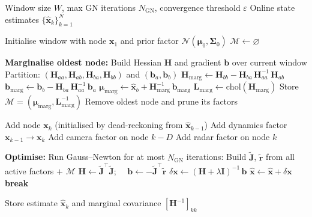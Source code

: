 \documentclass[11pt,a4paper]{article}
\newcommand{\bx}{\bm{x}}
\newcommand{\br}{\bm{r}}
\newcommand{\bb}{\bm{b}}
\newcommand{\bJ}{\bm{J}}
\newcommand{\bH}{\bm{H}}
\newcommand{\bI}{\bm{I}}
\newcommand{\bSigma}{\bm{\Sigma}}
\theoremstyle{definition}
\theoremstyle{plain}
\begin{document}
\begin{algorithm}[H]
\caption{Online Sliding-Window Factor Graph Optimisation}
\label{alg:swfgo}
\begin{algorithmic}[1]
\Require Window size $W$, max GN iterations $N_{\text{GN}}$, convergence threshold $\varepsilon$
\Ensure  Online state estimates $\{\hat{\bx}_k\}_{k=1}^{N}$

\State Initialise window with node $\bx_1$ and prior factor $\mathcal{N}(\bm{\mu}_0, \bSigma_0)$
\State $\mathcal{M} \leftarrow \varnothing$ 

    \State \textbf{Marginalise oldest node:}
    \State \hspace{1em} Build Hessian $\bH$ and gradient $\bb$ over current window
    \State \hspace{1em} Partition: $(\bH_{aa}, \bH_{ab}, \bH_{ba}, \bH_{bb})$ and $(\bb_a, \bb_b)$
    \State \hspace{1em} $\bH_{\text{marg}} \leftarrow \bH_{bb} - \bH_{ba}\,\bH_{aa}^{-1}\,\bH_{ab}$
    \State \hspace{1em} $\bb_{\text{marg}} \leftarrow \bb_b - \bH_{ba}\,\bH_{aa}^{-1}\,\bb_a$
    \State \hspace{1em} $\bm{\mu}_{\text{marg}} \leftarrow \hat{\bx}_b + \bH_{\text{marg}}^{-1}\,\bb_{\text{marg}}$
    \State \hspace{1em} $\bm{L}_{\text{marg}} \leftarrow \text{chol}(\bH_{\text{marg}})$
    \State \hspace{1em} Store $\mathcal{M} = (\bm{\mu}_{\text{marg}}, \bm{L}_{\text{marg}}^{-1})$
    \State \hspace{1em} Remove oldest node and prune its factors
  \EndIf

  \State Add node $\bx_k$ (initialised by dead-reckoning from $\hat{\bx}_{k-1}$)
  \State Add dynamics factor $\bx_{k-1} \to \bx_k$
    \State Add camera factor on node $k - D$
  \EndIf
    \State Add radar factor on node $k$
  \EndIf

  \State \textbf{Optimise:} Run Gauss--Newton for at most $N_{\text{GN}}$ iterations:
    \State Build $\tilde{\bJ}$, $\tilde{\br}$ from all active factors $+$ $\mathcal{M}$
    \State $\bH \leftarrow \tilde{\bJ}^\top\tilde{\bJ}$;
           $\quad \bb \leftarrow -\tilde{\bJ}^\top\tilde{\br}$
    \State $\delta\bx \leftarrow (\bH + \lambda\bI)^{-1}\,\bb$
    \State $\hat{\bx} \leftarrow \hat{\bx} + \delta\bx$
    \If{$\|\delta\bx\| < \varepsilon$}
      \State \textbf{break}
    \EndIf
  \EndFor

  \State Store estimate $\hat{\bx}_k$ and marginal covariance $[\bH^{-1}]_{kk}$
\EndFor
\end{algorithmic}
\end{algorithm}
\end{document}
